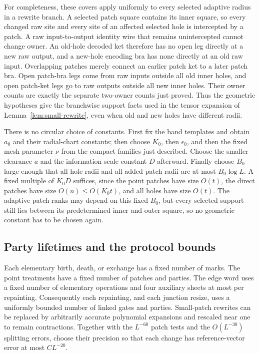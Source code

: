 For completeness, these covers apply uniformly to every selected
adaptive radius in a rewrite branch.  A selected patch square
contains its inner square, so every changed raw site and every site
of an affected selected hole is intercepted by a patch.  A raw
input-to-output identity wire that remains unintercepted cannot
change owner.  An old-hole decoded ket therefore has no open leg
directly at a new raw output, and a new-hole encoding bra has none
directly at an old raw input.  Overlapping patches merely connect an
earlier patch ket to a later patch bra.  Open patch-bra legs come
from raw inputs outside all old inner holes, and open patch-ket legs
go to raw outputs outside all new inner holes.  Their owner counts
are exactly the separate two-owner counts just proved.  Thus the
geometric hypotheses give the branchwise support facts used in the
tensor expansion of Lemma~\ref{lem:small-rewrite}, even when old
and new holes have different radii.

There is no circular choice of constants.  First fix the band
templates and obtain $a_0$ and their radial-chart constants; then
choose $K_0$, then $\epsilon_0$, and then the fixed mesh parameter
$\nu$ from the compact families just described.  Choose the smaller
clearance $a$ and the information scale constant $D$ afterward.
Finally choose $B_0$ large enough that all hole radii and all added
patch radii are at most $B_0\log L$.  A fixed multiple of $K_0D$
suffices, since the point patches have size $O(t)$, the direct
patches have size $O(n)\le O(K_0t)$, and all holes have size $O(t)$.
The adaptive patch ranks may depend on this fixed $B_0$, but every
selected support still lies between its predetermined inner and
outer square, so no geometric constant has to be chosen again.

\subsection{Party lifetimes and the protocol bounds}

Each elementary birth, death, or exchange has a fixed number of
marks.  The point treatments have a fixed number of patches and
parties.  The edge word uses a fixed number of elementary operations
and four auxiliary sheets at most per repainting.  Consequently each
repainting, and each junction resize, uses a uniformly bounded
number of linked gates and parties.  Small-patch rewrites can be
replaced by arbitrarily accurate polynomial expansions and rescaled
near one to remain contractions.  Together with the $L^{-60}$ patch
tests and the $O(L^{-30})$ splitting errors, choose their precision
so that each change has reference-vector error at most $C L^{-20}$.

